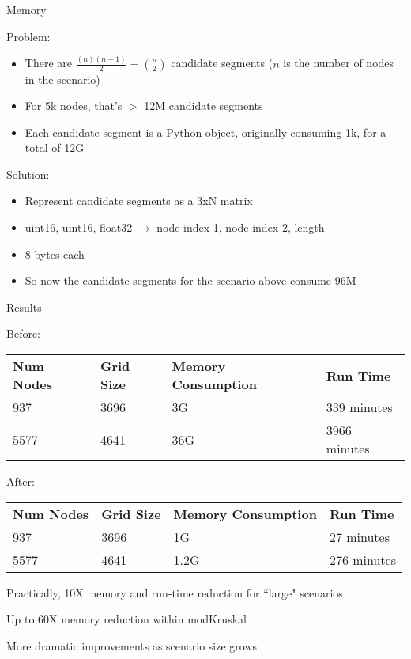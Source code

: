 \documentclass{beamer}
\begin{document}
\begin{frame}{Memory}
  
  Problem:
  \begin{itemize}
  \item[] There are $\frac{(n)(n-1)}{2} = {n \choose 2}$ candidate segments ($n$ is the number of nodes in the scenario)
  \item[] For 5k nodes, that's $>$ 12M candidate segments 
  \item[] Each candidate segment is a Python object, originally consuming 1k, for a total of 12G 
  \end{itemize}

  \bigskip 

  Solution:
  \begin{itemize}
  \item[] Represent candidate segments as a 3xN matrix
  \item[] uint16, uint16, float32 $\rightarrow$ node index 1, node index 2, length
  \item[] 8 bytes each
  \item[] So now the candidate segments for the scenario above consume 96M 
  \end{itemize}

\end{frame}

\begin{frame}{Results}
  
  
  Before:

  \bigskip 
  
  \begin{tabular}{ | l | l | l | l | }
    \textbf{Num Nodes} & \textbf{Grid Size} & \textbf{Memory Consumption} & \textbf{Run Time} \\
    937 & 3696 & 3G  & 339 minutes \\
    5577 & 4641 & 36G  & 3966 minutes \\
  \end{tabular}

  \bigskip 

  After:

  \bigskip 

  \begin{tabular}{ | l | l | l | l | }
    \textbf{Num Nodes} & \textbf{Grid Size} & \textbf{Memory Consumption} & \textbf{Run Time} \\
    937 & 3696 & 1G  & 27 minutes \\
    5577 & 4641 & 1.2G  & 276 minutes \\
  \end{tabular}

  \bigskip

  Practically, 10X memory and run-time reduction for ``large" scenarios

  Up to 60X memory reduction within modKruskal

  More dramatic improvements as scenario size grows
  
\end{frame}
\end{document}
